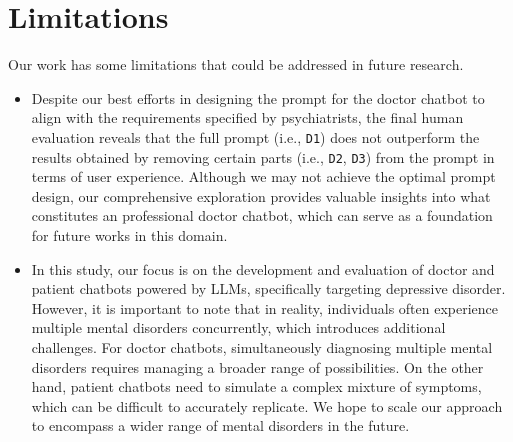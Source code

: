 \section{Limitations}
\label{sec:limitation}

Our work has some limitations that could be addressed in future research. 

\begin{itemize}
    \item Despite our best efforts in designing the prompt for the doctor chatbot to align with the requirements specified by psychiatrists, the final human evaluation reveals that the full prompt (i.e., \texttt{D1}) does not outperform the results obtained by removing certain parts (i.e., \texttt{D2}, \texttt{D3}) from the prompt in terms of user experience. Although we may not achieve the optimal prompt design, our comprehensive exploration provides valuable insights into what constitutes an professional doctor chatbot, which can serve as a foundation for future works in this domain.
   \item In this study, our focus is on the development and evaluation of doctor and patient chatbots powered by LLMs, specifically targeting depressive disorder. However, it is important to note that in reality, individuals often experience multiple mental disorders concurrently, which introduces additional challenges. For doctor chatbots, simultaneously diagnosing multiple mental disorders requires managing a broader range of possibilities. On the other hand, patient chatbots need to simulate a complex mixture of symptoms, which can be difficult to accurately replicate. We hope to scale our approach to encompass a wider range of mental disorders in the future.
\end{itemize}

